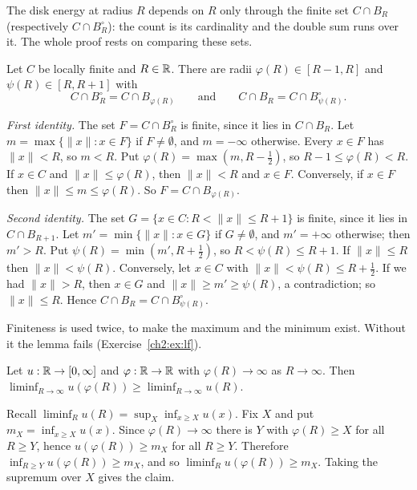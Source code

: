 The disk energy at radius $R$ depends on $R$ only through the finite set $C\cap B_R$ (respectively $C\cap B^\circ_R$):
the count is its cardinality and the double sum runs over it. The whole proof rests on comparing these sets.

\begin{lemma}\label{ch2:lem:sets}
Let $C$ be locally finite and $R\in\mathbb{R}$. There are radii $\varphi(R)\in[R-1,R]$ and $\psi(R)\in[R,R+1]$ with
\[
C\cap B^\circ_R=C\cap B_{\varphi(R)}\qquad\text{and}\qquad C\cap B_R=C\cap B^\circ_{\psi(R)}.
\]
\end{lemma}

\begin{humanproof}
\emph{First identity.} The set $F=C\cap B^\circ_R$ is finite, since it lies in $C\cap B_R$. Let $m=\max\{\|x\|:x\in F\}$
if $F\neq\emptyset$, and $m=-\infty$ otherwise. Every $x\in F$ has $\|x\|<R$, so $m<R$. Put
$\varphi(R)=\max(m,R-\tfrac12)$, so $R-1\le\varphi(R)<R$. If $x\in C$ and $\|x\|\le\varphi(R)$, then $\|x\|<R$ and
$x\in F$. Conversely, if $x\in F$ then $\|x\|\le m\le\varphi(R)$. So $F=C\cap B_{\varphi(R)}$.

\emph{Second identity.} The set $G=\{x\in C:R<\|x\|\le R+1\}$ is finite, since it lies in $C\cap B_{R+1}$. Let
$m'=\min\{\|x\|:x\in G\}$ if $G\neq\emptyset$, and $m'=+\infty$ otherwise; then $m'>R$. Put
$\psi(R)=\min(m',R+\tfrac12)$, so $R<\psi(R)\le R+1$. If $\|x\|\le R$ then $\|x\|<\psi(R)$. Conversely, let $x\in C$ with
$\|x\|<\psi(R)\le R+\frac12$. If we had $\|x\|>R$, then $x\in G$ and $\|x\|\ge m'\ge\psi(R)$, a contradiction; so
$\|x\|\le R$. Hence $C\cap B_R=C\cap B^\circ_{\psi(R)}$.
\end{humanproof}

Finiteness is used twice, to make the maximum and the minimum exist. Without it the lemma fails
(Exercise~\ref{ch2:ex:lf}).

\begin{lemma}\label{ch2:lem:repar}
Let $u:\mathbb{R}\to[0,\infty]$ and $\varphi:\mathbb{R}\to\mathbb{R}$ with $\varphi(R)\to\infty$ as $R\to\infty$. Then
$\liminf_{R\to\infty}u(\varphi(R))\ge\liminf_{R\to\infty}u(R)$.
\end{lemma}

\begin{humanproof}
Recall $\liminf_Ru(R)=\sup_X\inf_{x\ge X}u(x)$. Fix $X$ and put $m_X=\inf_{x\ge X}u(x)$. Since $\varphi(R)\to\infty$ there
is $Y$ with $\varphi(R)\ge X$ for all $R\ge Y$, hence $u(\varphi(R))\ge m_X$ for all $R\ge Y$. Therefore
$\inf_{R\ge Y}u(\varphi(R))\ge m_X$, and so $\liminf_Ru(\varphi(R))\ge m_X$. Taking the supremum over $X$ gives the claim.
\end{humanproof}

